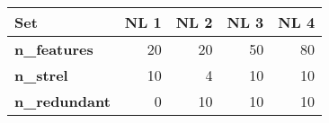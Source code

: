 \begin{tabular}{lrrrr}
\toprule
\textbf{Set} &  NL 1 &  NL 2 &  NL 3 &  NL 4 \\
\midrule
\textbf{n\_features } &    20 &    20 &    50 &    80 \\
\textbf{n\_strel    } &    10 &     4 &    10 &    10 \\
\textbf{n\_redundant} &     0 &    10 &    10 &    10 \\
\bottomrule
\end{tabular}
